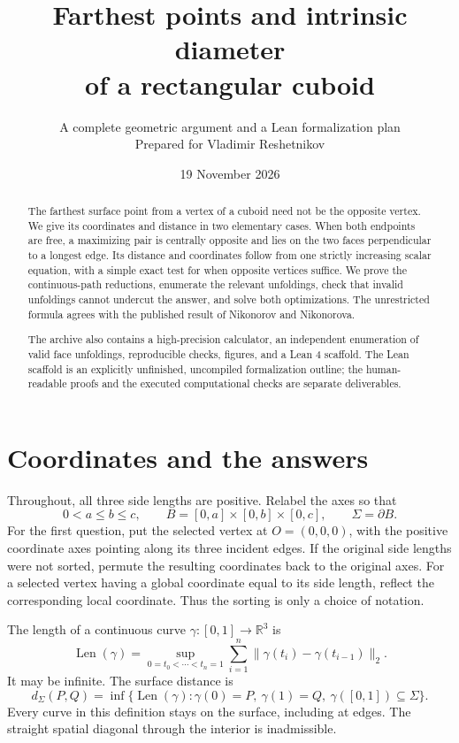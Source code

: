 \documentclass[11pt]{article}
\title{\color{navy}\bfseries Farthest points and intrinsic diameter\\[3pt]
of a rectangular cuboid}
\author{A complete geometric argument and a Lean formalization plan\\[4pt]
\small Prepared for Vladimir Reshetnikov}
\date{19 November 2026}
\theoremstyle{definition}
\newcommand{\R}{\mathbb R}
\newcommand{\surf}{\Sigma}
\newcommand{\dist}{d_{\surf}}
\begin{document}
\maketitle
\begin{abstract}
The farthest surface point from a vertex of a cuboid need not be the
opposite vertex. We give its coordinates and distance in two elementary
cases. When both endpoints are free, a maximizing pair is centrally
opposite and lies on the two faces perpendicular to a longest edge.
Its distance and coordinates follow from one strictly increasing scalar
equation, with a simple exact test for when opposite vertices suffice.
We prove the continuous-path reductions, enumerate the relevant
unfoldings, check that invalid unfoldings cannot undercut the answer,
and solve both optimizations. The unrestricted formula agrees with the
published result of Nikonorov and Nikonorova.

The archive also contains a high-precision calculator, an independent
enumeration of valid face unfoldings, reproducible checks, figures, and
a Lean 4 scaffold. The Lean scaffold is an explicitly unfinished,
uncompiled formalization outline; the human-readable proofs and the
executed computational checks are separate deliverables.
\end{abstract}
\setcounter{tocdepth}{1}
\tableofcontents
\newpage

\section{Coordinates and the answers}

Throughout, all three side lengths are positive. Relabel the axes so that
\[
0<a\le b\le c,\qquad
B=[0,a]\times[0,b]\times[0,c],\qquad \surf=\partial B.
\]
For the first question, put the selected vertex at \(O=(0,0,0)\), with
the positive coordinate axes pointing along its three incident edges.
If the original side lengths were not sorted, permute the resulting
coordinates back to the original axes. For a selected vertex having a
global coordinate equal to its side length, reflect the corresponding
local coordinate. Thus the sorting is only a choice of notation.

The length of a continuous curve \(\gamma:[0,1]\to\R^3\) is
\[
\operatorname{Len}(\gamma)=
\sup_{0=t_0<\cdots<t_n=1}
\sum_{i=1}^{n}\|\gamma(t_i)-\gamma(t_{i-1})\|_2.
\]
It may be infinite. The surface distance is
\[
\dist(P,Q)=\inf\{\operatorname{Len}(\gamma):
\gamma(0)=P,\ \gamma(1)=Q,\ \gamma([0,1])\subseteq\surf\}.
\]
Every curve in this definition stays on the surface, including at edges.
The straight spatial diagonal through the interior is inadmissible.
\end{document}
